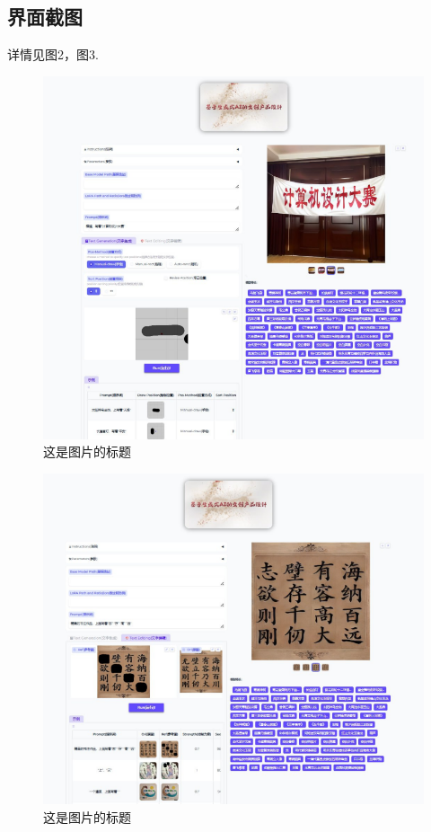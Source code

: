 \documentclass[a4paper,12pt]{article}
\begin{document}
\subsection{界面截图}
详情见图2，图3.
\begin{figure}[htbp] %
    \centering %
    \includegraphics[width=1\textwidth]{Image/UI_1.png} %
    \caption{这是图片的标题} %
    \label{fig:logo} %
\end{figure}
\begin{figure}[htbp] %
    \centering %
    \includegraphics[width=1\textwidth]{Image/UI_2.png} %
    \caption{这是图片的标题} %
    \label{fig:logo} %
\end{figure}
\end{document}
